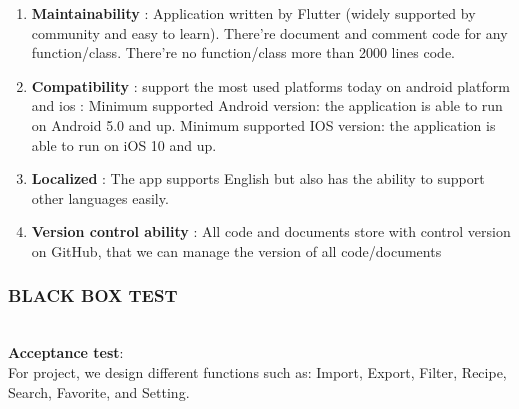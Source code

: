 \documentclass{article}
\begin{document}
\begin{enumerate}
        \item \textbf{Maintainability} : Application written by Flutter (widely supported by community and easy to learn). There’re document and comment code for any function/class. There’re no function/class more than 2000 lines code. 
        \item \textbf{Compatibility} : support the most used platforms today on android platform and ios :  Minimum supported Android version: the application is able to run on Android 5.0 and up.  Minimum supported IOS version: the application is able to run on iOS 10 and up. 
        \item \textbf{Localized} : The app supports English but also has the ability to support other languages easily. 
        \item \textbf{Version control ability} : All code and documents store with control version on GitHub, that we can manage the version of all code/documents 
    \end{enumerate}
\newpage
\subsubsection{BLACK BOX TEST} \\
\textbf{Acceptance test}: \\
    For project, we design different functions such as: Import, Export, Filter, Recipe, Search, Favorite, and Setting. \\
\end{document}
